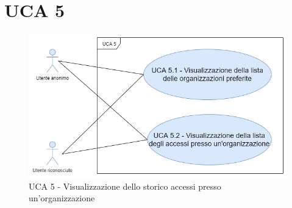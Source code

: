 \newpage
\section{UCA 5}
\begin{figure}[h]
	\centering
	\caption{UCA 5 - Visualizzazione dello storico accessi presso un'organizzazione}
	\includegraphics[scale=0.5]{sezioni/UseCase/Immagini/UCA5.png}
\end{figure}
